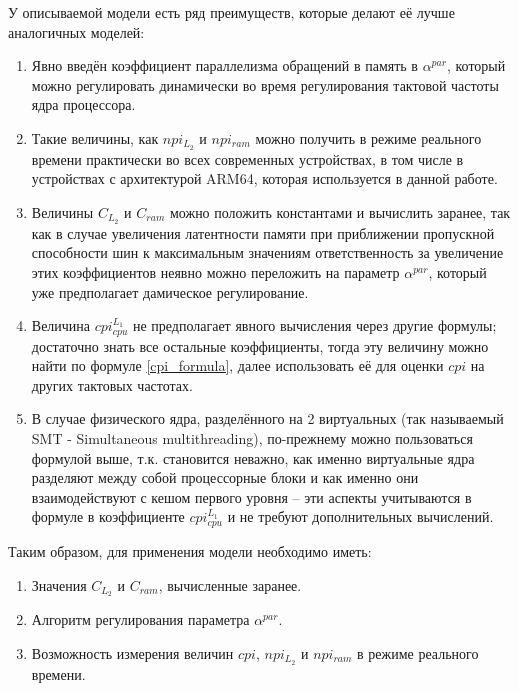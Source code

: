     У описываемой модели есть ряд преимуществ, которые делают её лучше аналогичных моделей:
    \begin{enumerate}
        \item Явно введён коэффициент параллелизма обращений в память в $\alpha^{par}$, который можно
        регулировать динамически во время регулирования тактовой частоты ядра процессора.
        \item Такие величины, как $npi_{L_2}$ и $npi_{ram}$ можно получить в режиме реального времени
        практически во всех современных устройствах, в том числе в устройствах с архитектурой ARM64,
        которая используется в данной работе.
        \item Величины $C_{L_2}$ и $C_{ram}$ можно положить константами и вычислить заранее, так как
        в случае увеличения латентности памяти при приближении пропускной способности шин к максимальным
        значениям ответственность за увеличение этих коэффициентов неявно можно переложить на параметр
        $\alpha^{par}$, который уже предполагает дамическое регулирование.
        \item Величина $cpi_{cpu}^{L_1}$ не предполагает явного вычисления через другие формулы;
        достаточно знать все остальные коэффициенты, тогда эту величину можно найти по формуле
        \eqref{cpi_formula}, далее использовать её для оценки $cpi$ на других тактовых частотах.
        \item В случае физического ядра, разделённого на 2 виртуальных (так называемый
        SMT - Simultaneous multithreading), по-прежнему можно пользоваться формулой выше, т.к.
        становится неважно, как именно виртуальные ядра разделяют между собой процессорные блоки
        и как именно они взаимодействуют с кешом первого уровня -- эти аспекты учитываются
        в формуле в коэффициенте $cpi_{cpu}^{L_1}$ и не требуют дополнительных вычислений.
    \end{enumerate}

    Таким образом, для применения модели необходимо иметь:
    \begin{enumerate}
        \item Значения $C_{L_2}$ и $C_{ram}$, вычисленные заранее.
        \item Алгоритм регулирования параметра $\alpha^{par}$.
        \item Возможность измерения величин $cpi$, $npi_{L_2}$ и $npi_{ram}$ в режиме реального времени.
    \end{enumerate}

